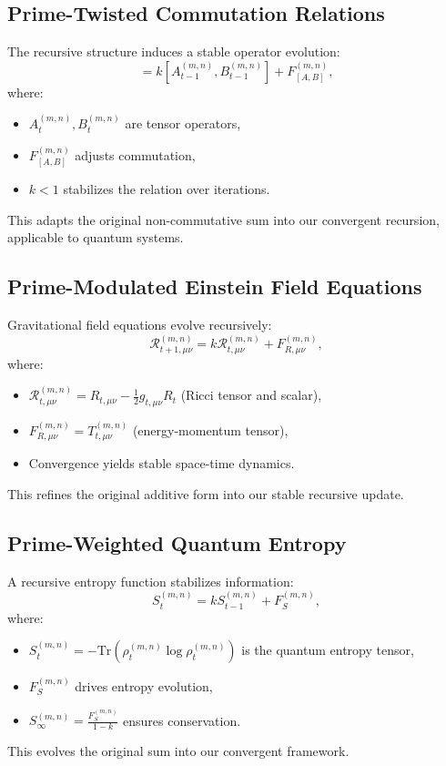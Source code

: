 \documentclass{article}
\theoremstyle{plain}
\begin{document}
\subsection{Prime-Twisted Commutation Relations}
The recursive structure induces a stable operator evolution:
\begin{equation}
    [A_t^{(m,n)}, B_t^{(m,n)}] = k [A_{t-1}^{(m,n)}, B_{t-1}^{(m,n)}] + F_{[A,B]}^{(m,n)},
\end{equation}
where:
\begin{itemize}
    \item \( A_t^{(m,n)}, B_t^{(m,n)} \) are tensor operators,
    \item \( F_{[A,B]}^{(m,n)} \) adjusts commutation,
    \item \( k < 1 \) stabilizes the relation over iterations.
\end{itemize}
This adapts the original non-commutative sum into our convergent recursion, applicable to quantum systems.

\subsection{Prime-Modulated Einstein Field Equations}
Gravitational field equations evolve recursively:
\begin{equation}
    \mathcal{R}_{t+1,\mu\nu}^{(m,n)} = k \mathcal{R}_{t,\mu\nu}^{(m,n)} + F_{R,\mu\nu}^{(m,n)},
\end{equation}
where:
\begin{itemize}
    \item \( \mathcal{R}_{t,\mu\nu}^{(m,n)} = R_{t,\mu\nu} - \frac{1}{2} g_{t,\mu\nu} R_t \) (Ricci tensor and scalar),
    \item \( F_{R,\mu\nu}^{(m,n)} = T_{t,\mu\nu}^{(m,n)} \) (energy-momentum tensor),
    \item Convergence yields stable space-time dynamics.
\end{itemize}
This refines the original additive form into our stable recursive update.

\subsection{Prime-Weighted Quantum Entropy}
A recursive entropy function stabilizes information:
\begin{equation}
    S_t^{(m,n)} = k S_{t-1}^{(m,n)} + F_S^{(m,n)},
\end{equation}
where:
\begin{itemize}
    \item \( S_t^{(m,n)} = -\text{Tr}(\rho_t^{(m,n)} \log \rho_t^{(m,n)}) \) is the quantum entropy tensor,
    \item \( F_S^{(m,n)} \) drives entropy evolution,
    \item \( S_\infty^{(m,n)} = \frac{F_S^{(m,n)}}{1 - k} \) ensures conservation.
\end{itemize}
This evolves the original sum into our convergent framework.
\end{document}
